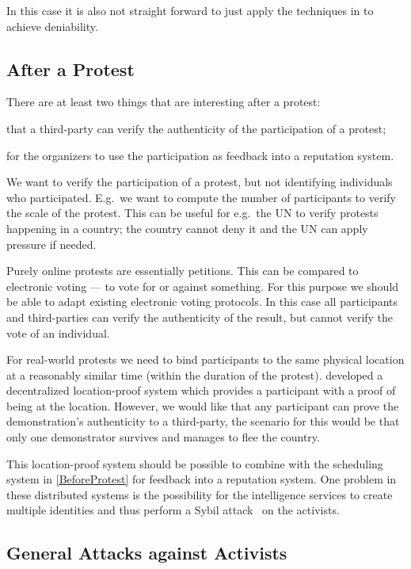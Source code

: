 \documentclass[a4paper]{llncs}
\begin{document}
In this case it is also not straight forward to just apply the techniques in 
\cite{OTPKX} to achieve deniability.

\subsection{After a Protest}
\label{AfterProtest}

There are at least two things that are interesting after a protest:
\begin{inparaenum}[(a)]
\item that a third-party can verify the authenticity of the participation of 
  a protest;
\item for the organizers to use the participation as feedback into a reputation 
  system.
\end{inparaenum}
We want to verify the participation of a protest, but not identifying 
individuals who participated.
E.g.\ we want to compute the number of participants to verify the scale of the 
protest.
This can be useful for e.g.\ the UN to verify protests happening in a country; 
the country cannot deny it and the UN can apply pressure if needed.

Purely online protests are essentially petitions.
This can be compared to electronic voting --- to vote for or against something.
For this purpose we should be able to adapt existing electronic voting 
protocols.
In this case all participants and third-parties can verify the authenticity of 
the result, but cannot verify the vote of an individual.

For real-world protests we need to bind participants to the same physical 
location at a reasonably similar time (within the duration of the protest).
\citet{PROPS} developed a decentralized location-proof system which provides 
a participant with a proof of being at the location.
However, we would like that any participant can prove the demonstration's 
authenticity to a third-party, the scenario for this would be that only one 
demonstrator survives and manages to flee the country.

This location-proof system should be possible to combine with the scheduling 
system in \cref{BeforeProtest} for feedback into a reputation system.
One problem in these distributed systems is the possibility for the 
intelligence services to create multiple identities and thus perform a Sybil 
attack~\cite{SybilAttack} on the activists.

\subsection{General Attacks against Activists}
\label{GeneralAttacks}
\end{document}
